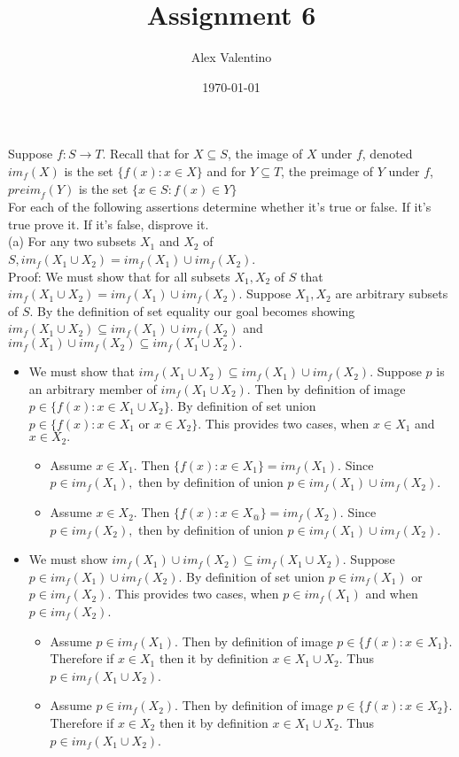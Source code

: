 \documentclass[12pt, letterpaper]{article}
\date{\today}
\author{Alex Valentino}
\title{Assignment 6}
\begin{document}
	Suppose $f: S \longrightarrow T$. Recall that for $X \subseteq S$, the image of $X$ under $f$, denoted ${im}_f(X)$ is the set $\{f(x): x \in X\}$ and for $Y \subseteq T$, the preimage of $Y$ under $f$, ${preim}_f(Y)$ is the set $\{x \in S: f(x) \in Y\}$\\
For each of the following assertions determine whether it's true or false. If it's true prove it. If it's false, disprove it.\\
(a) For any two subsets $X_1$ and $X_2$ of $S, {im}_f(X_1 \cup X_2)= im_f(X_1) \cup im_f(X_2)$.\\
	Proof: We must show that for all subsets $X_1,X_2$ of $S$ that ${im}_f(X_1 \cup X_2)= im_f(X_1) \cup im_f(X_2)$.  Suppose $X_1,X_2$ are arbitrary subsets of $S$.  By the definition of set equality our goal becomes showing ${im}_f(X_1 \cup X_2) \subseteq im_f(X_1) \cup im_f(X_2)$ and $im_f(X_1) \cup im_f(X_2) \subseteq {im}_f(X_1 \cup X_2).$  
	\begin{itemize}
		\item We must show that ${im}_f(X_1 \cup X_2) \subseteq im_f(X_1) \cup im_f(X_2)$.  Suppose $p$ is an arbitrary member of $im_f(X_1 \cup X_2).$  Then by definition of image $p \in \{f(x): x \in X_1 \cup X_2\}.$  By definition of set union $p \in \{f(x): x \in X_1 \text{ or } x \in X_2\}.$  This provides two cases, when $x\in X_1$ and $x \in X_2.$  
		\begin{itemize}
			\item Assume $x \in X_1.$  Then $\{f(x): x \in X_1\} = im_f(X_1).$  Since $p \in im_f(X_1),$ then by definition of union $p \in im_f(X_1) \cup im_f(X_2).$   
			\item Assume $x \in X_2.$  Then $\{f(x): x \in X_@\} = im_f(X_2).$  Since $p \in im_f(X_2),$ then by definition of union $p \in im_f(X_1) \cup im_f(X_2).$  
		\end{itemize}
		\item We must show $im_f(X_1) \cup im_f(X_2) \subseteq {im}_f(X_1 \cup X_2)$.  Suppose $p \in im_f(X_1) \cup im_f(X_2).$  By definition of set union $p \in im_f(X_1)$ or $p \in im_f(X_2)$.  This provides two cases, when $p \in im_f(X_1)$ and when $p \in  im_f(X_2)$.  
	\begin{itemize}
		\item Assume $p \in im_f(X_1).$ Then by definition of image $p \in \{f(x): x \in X_1\}$. Therefore if $x \in X_1$ then it by definition $x \in X_1 \cup X_2$.  Thus $p \in im_f(X_1 \cup X_2)$.  	   
		\item Assume $p \in im_f(X_2).$ Then by definition of image $p \in \{f(x): x \in X_2\}$. Therefore if $x \in X_2$ then it by definition $x \in X_1 \cup X_2$.  Thus $p \in im_f(X_1 \cup X_2)$.  	   
	\end{itemize}			 
	\end{itemize}
\end{document}
